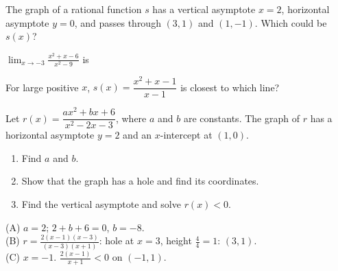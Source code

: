 \begin{exo}{}
The graph of a rational function $s$ has a vertical asymptote $x=2$, horizontal asymptote $y=0$, and passes through $(3,1)$ and $(1,-1)$. Which could be $s(x)$?
\end{exo}
\begin{exo}[1.11]{}
$\displaystyle\lim_{x\to-3}\frac{x^2+x-6}{x^2-9}$ is
\end{exo}
\begin{exo}[1.7]{}
For large positive $x$, $s(x)=\dfrac{x^2+x-1}{x-1}$ is closest to which line?
\end{exo}
\begin{exo}{}
Let $r(x)=\dfrac{ax^2+bx+6}{x^2-2x-3}$, where $a$ and $b$ are constants. The graph of $r$ has a horizontal asymptote $y=2$ and an $x$-intercept at $(1,0)$.
\begin{enumerate}[label=(\Alph*)]
\item Find $a$ and $b$.
\item Show that the graph has a hole and find its coordinates.
\item Find the vertical asymptote and solve $r(x)<0$.
\end{enumerate}
\begin{solution}
(A) $a=2$; $2+b+6=0$, $b=-8$.\\
(B) $r=\frac{2(x-1)(x-3)}{(x-3)(x+1)}$: hole at $x=3$, height $\frac{4}{4}=1$: $(3,1)$.\\
(C) $x=-1$. $\frac{2(x-1)}{x+1}<0$ on $(-1,1)$.
\end{solution}
\end{exo}

